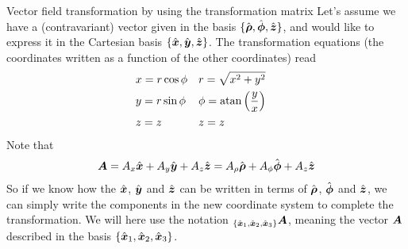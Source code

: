 \documentclass[a4paper, 12pt]{article}
\begin{document}
\begin{example}{Vector field transformation by using the transformation matrix}
 \label{ex:vft}
 Let's assume we have a (contravariant) vector given in the basis $\{\hat{\boldsymbol{\rho}}, 
 \hat{\boldsymbol{\phi}}, \hat{\boldsymbol{z}}\}$, and would like to express it in the Cartesian basis 
 $\{\hat{\boldsymbol{x}}, \hat{\boldsymbol{y}}, \hat{\boldsymbol{z}}\}$. The transformation equations (the coordinates 
 written as a function of the other coordinates) read
 \begin{align*}
  &x = r \cos\phi&
  &r = \sqrt{x^2+y^2}&
  \\
  &y = r \sin\phi&
  &\phi = \text{atan}\left(\frac{y}{x}\right)&
  \\
  &z=z&
  &z=z&
 \end{align*}
 Note that
 \begin{align}
  \boldsymbol{A} =
  A_x \hat{\boldsymbol{x}} + A_y \hat{\boldsymbol{y}} + A_z \hat{\boldsymbol{z}} =
  A_\rho \hat{\boldsymbol{\rho}} + A_\phi \hat{\boldsymbol{\phi}} + A_z  \hat{\boldsymbol{z}}
  \label{eq:component}
 \end{align}
 So if we know how the $\hat{\boldsymbol{x}}$, $\hat{\boldsymbol{y}}$ and $\hat{\boldsymbol{z}}$ can be written in terms 
 of $\hat{\boldsymbol{\rho}}$, $\hat{\boldsymbol{\phi}}$ and $\hat{\boldsymbol{z}}$, we can simply write the components 
 in the new coordinate system to complete the transformation. We will here use 
 the notation $_{\{\hat{\boldsymbol{x}}_1, \hat{\boldsymbol{x}}_2, \hat{\boldsymbol{x}}_3\}} \boldsymbol{A}$, meaning the vector 
 $\boldsymbol{A}$ described in the basis ${\{\hat{\boldsymbol{x}}_1, \hat{\boldsymbol{x}}_2, \hat{\boldsymbol{x}}_3\}}$.
 

\end{example}
\end{document}
